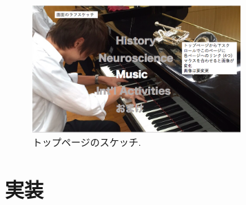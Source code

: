 \documentclass{jarticle}
\begin{document}
\begin{figure}[H]
  \begin{center}
    \includegraphics[clip,width=8cm]{./images/top_page_sketch.png}
    \caption{トップページのスケッチ.}
  \end{center}
\end{figure}


\section{実装}
\end{document}
